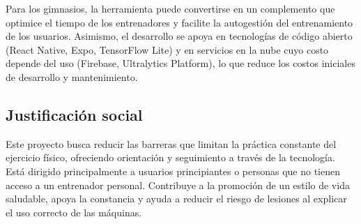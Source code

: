 Para los gimnasios, la herramienta puede convertirse en un complemento que
optimice el tiempo de los entrenadores y facilite la autogestión del
entrenamiento de los usuarios. Asimismo, el desarrollo se apoya en tecnologías
de código abierto (React Native, Expo, TensorFlow Lite) y en servicios en la
nube cuyo costo depende del uso (Firebase, Ultralytics Platform), lo que reduce los costos iniciales
de desarrollo y mantenimiento.

\subsection{Justificación social}

Este proyecto busca reducir las barreras que limitan la práctica constante del
ejercicio físico, ofreciendo orientación y seguimiento a través de la
tecnología. Está dirigido principalmente a usuarios principiantes o personas
que no tienen acceso a un entrenador personal. Contribuye a la promoción de un
estilo de vida saludable, apoya la constancia y ayuda a reducir el riesgo de
lesiones al explicar el uso correcto de las máquinas.
